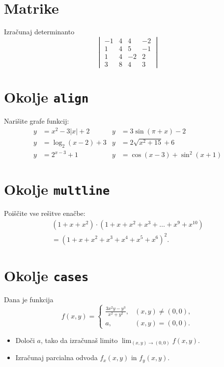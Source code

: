 \documentclass[a4paper,12pt]{article}
\begin{document}
\section*{Matrike}
Izračunaj determinanto
\[
\begin{vmatrix}
     -1 & 4 & 4 & -2 \\
    1 & 4 & 5 & -1 \\
    1 & 4 & -2 & 2 \\
    3 & 8 & 4 & 3 \
\end{vmatrix}
\]

\section*{Okolje \texttt{align}}
Narišite grafe funkcij:
\begin{align*}
y &= x^2 - 3|x| + 2
& y &= 3\sin(\pi+x)-2 \\
y &= \log_2(x-2)+3
& y &= 2\sqrt{x^2+15}+6 \\
y &= 2^{x-3}+1
& y &= \cos(x-3)+\sin^2(x+1)
\end{align*}



\section*{Okolje \texttt{multline}}
Poiščite vse rešitve enačbe:
\begin{multline*}
(1+x+x^2)\cdot
(1+x+x^2+x^3+\ldots+x^9+x^{10})\\
=(1+x+x^2+x^3+x^4+x^5+x^6)^2.
\end{multline*}

\section*{Okolje \texttt{cases}}
Dana je funkcija
   \[
f(x,y)=
\begin{cases}
\frac{3x^2y-y^3}{x^2+y^2}, & (x,y)\neq(0,0),\\
a, & (x,y)=(0,0).
\end{cases}
\]
\begin{itemize}
\item Določi \(a\), tako da izračunaš limito \( \lim_{(x,y)\to(0,0)} f(x,y) \).
\item Izračunaj parcialna odvoda \(f_x(x,y)\) in \(f_y(x,y)\).
\end{itemize}
\end{document}
